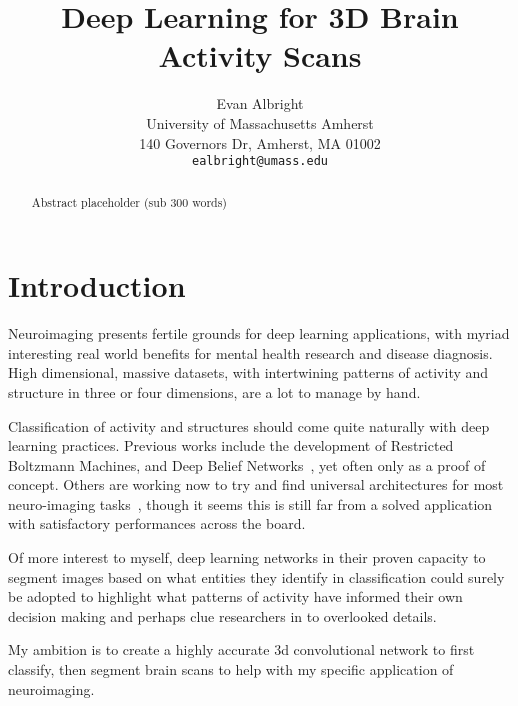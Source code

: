 \documentclass[10pt,twocolumn,letterpaper]{article}
\begin{document}
\title{Deep Learning for 3D Brain Activity Scans}

\author{Evan Albright\\
University of Massachusetts Amherst\\
140 Governors Dr, Amherst, MA 01002\\
{\tt\small ealbright@umass.edu}
}

\maketitle

\begin{abstract}
   Abstract placeholder (sub 300 words)
\end{abstract}

\section{Introduction}\label{sec:introduction}
Neuroimaging presents fertile grounds for deep learning applications, with myriad interesting real world benefits
for mental health research and disease diagnosis.
High dimensional, massive datasets, with intertwining patterns of activity and structure in three or four
dimensions, are a lot to manage by hand.

Classification of activity and structures should come quite naturally with deep learning practices.
Previous works include the development of Restricted Boltzmann Machines, and Deep Belief Networks~\cite{plis2014deep},
yet often only as a proof of concept.
Others are working now to try and find universal architectures for most
neuro-imaging tasks~\cite{henschel2019fastsurfer}, though it seems this is still far from a solved
application with satisfactory performances across the board.

Of more interest to myself, deep learning networks in their proven capacity to segment images based on what entities
they identify in classification could surely be adopted to highlight what patterns of activity have informed their
own decision making and perhaps clue researchers in to overlooked details.

My ambition is to create a highly accurate 3d convolutional network to first classify, then segment brain scans to
help with my specific application of neuroimaging.
\end{document}
